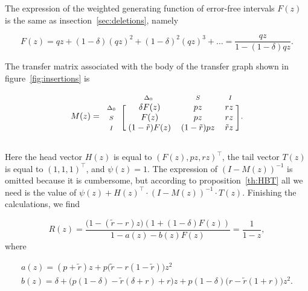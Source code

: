 \documentclass{article}
\newcommand{\smI}{\scriptstyle{I}}
\newcommand{\smS}{\scriptstyle{S}}
\newcommand{\smDELz}{\scriptstyle{\Delta_0}}
\begin{document}
The expression of the weighted generating function of error-free intervals
$F(z)$ is the same as insection~\ref{sec:deletions}, namely

\begin{equation*}
F(z) = qz + (1-\delta)(qz)^2 + (1-\delta)^2(qz)^3 + \ldots =
\frac{qz}{1-(1-\delta)qz}.
\end{equation*}

The transfer matrix associated with the body of the transfer graph shown
in figure~\ref{fig:insertions} is

\begin{equation*}
M(z) = 
\begin{blockarray}{cccc}
       & \smDELz & \smS & \smI \\
\begin{block}{c[ccc]}
\smDELz & \; \delta F(z) & pz & rz \; \\
\smS    & \;        F(z) & pz & rz \; \\
\smI    & \; (1-\tilde{r})F(z)
           & (1-\tilde{r})pz & \tilde{r}z \; \\
\end{block}
\end{blockarray}.
\end{equation*}

Here the head vector $H(z)$ is equal to $(F(z), pz, rz)^\top$, the tail
vector $T(z)$ is equal to $(1,1,1)^\top$, and $\psi(z) = 1$. The
expression of $(I-M(z))^{-1}$ is omitted because it is cumbersome, but
according to proposition~\ref{th:HBT} all we need is the value of
$\psi(z)+H(z)^\top \cdot (I-M(z))^{-1} \cdot T(z)$. Finishing the
calculations, we find

\begin{equation}
\label{eq:Rindel}
R(z) = \frac{\big( 1-(\tilde{r}-r)z \big)
\left(1+(1-\delta)F(z) \right)}{1-a(z)-b(z)F(z)}
= \frac{1}{1-z},
\end{equation}
where

\begin{equation}
\begin{gathered}
\label{eq:a+b}
a(z) = (p+\tilde{r})z + p\big(\tilde{r}-r(1-\tilde{r})\big)z^2 \\
b(z) = \delta + \big(p(1-\delta) - \tilde{r}(\delta+r)+r\big)z
+ p(1-\delta)\big(r-\tilde{r}(1+r)\big)z^2.
\end{gathered}
\end{equation}
\end{document}
